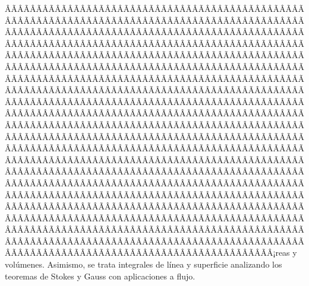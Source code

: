 \begin{sumilla}
\begin{fundamentacion}
ÂÃÂÃÂÃÂÃÂÃÂÃÂÃÂÃÂÃÂÃÂÃÂÃÂÃÂÃÂÃÂÃÂÃÂÃÂÃÂÃÂÃÂÃÂÃÂÃÂÃÂÃÂÃÂÃÂÃÂÃÂÃÂÃÂÃÂÃÂÃÂÃÂÃÂÃÂÃÂÃÂÃÂÃÂÃÂÃÂÃÂÃÂÃÂÃÂÃÂÃÂÃÂÃÂÃÂÃÂÃÂÃÂÃÂÃÂÃÂÃÂÃÂÃÂÃÂÃÂÃÂÃÂÃÂÃÂÃÂÃÂÃÂÃÂÃÂÃÂÃÂÃÂÃÂÃÂÃÂÃÂÃÂÃÂÃÂÃÂÃÂÃÂÃÂÃÂÃÂÃÂÃÂÃÂÃÂÃÂÃÂÃÂÃÂÃÂÃÂÃÂÃÂÃÂÃÂÃÂÃÂÃÂÃÂÃÂÃÂÃÂÃÂÃÂÃÂÃÂÃÂÃÂÃÂÃÂÃÂÃÂÃÂÃÂÃÂÃÂÃÂÃÂÃÂÃÂÃÂÃÂÃÂÃÂÃÂÃÂÃÂÃÂÃÂÃÂÃÂÃÂÃÂÃÂÃÂÃÂÃÂÃÂÃÂÃÂÃÂÃÂÃÂÃÂÃÂÃÂÃÂÃÂÃÂÃÂÃÂÃÂÃÂÃÂÃÂÃÂÃÂÃÂÃÂÃÂÃÂÃÂÃÂÃÂÃÂÃÂÃÂÃÂÃÂÃÂÃÂÃÂÃÂÃÂÃÂÃÂÃÂÃÂÃÂÃÂÃÂÃÂÃÂÃÂÃÂÃÂÃÂÃÂÃÂÃÂÃÂÃÂÃÂÃÂÃÂÃÂÃÂÃÂÃÂÃÂÃÂÃÂÃÂÃÂÃÂÃÂÃÂÃÂÃÂÃÂÃÂÃÂÃÂÃÂÃÂÃÂÃÂÃÂÃÂÃÂÃÂÃÂÃÂÃÂÃÂÃÂÃÂÃÂÃÂÃÂÃÂÃÂÃÂÃÂÃÂÃÂÃÂÃÂÃÂÃÂÃÂÃÂÃÂÃÂÃÂÃÂÃÂÃÂÃÂÃÂÃÂÃÂÃÂÃÂÃÂÃÂÃÂÃÂÃÂÃÂÃÂÃÂÃÂÃÂÃÂÃÂÃÂÃÂÃÂÃÂÃÂÃÂÃÂÃÂÃÂÃÂÃÂÃÂÃÂÃÂÃÂÃÂÃÂÃÂÃÂÃÂÃÂÃÂÃÂÃÂÃÂÃÂÃÂÃÂÃÂÃÂÃÂÃÂÃÂÃÂÃÂÃÂÃÂÃÂÃÂÃÂÃÂÃÂÃÂÃÂÃÂÃÂÃÂÃÂÃÂÃÂÃÂÃÂÃÂÃÂÃÂÃÂÃÂÃÂÃÂÃÂÃÂÃÂÃÂÃÂÃÂÃÂÃÂÃÂÃÂÃÂÃÂÃÂÃÂÃÂÃÂÃÂÃÂÃÂÃÂÃÂÃÂÃÂÃÂÃÂÃÂÃÂÃÂÃÂÃÂÃÂÃÂÃÂÃÂÃÂÃÂÃÂÃÂÃÂÃÂÃÂÃÂÃÂÃÂÃÂÃÂÃÂÃÂÃÂÃÂÃÂÃÂÃÂÃÂÃÂÃÂÃÂÃÂÃÂÃÂÃÂÃÂÃÂÃÂÃÂÃÂÃÂÃÂÃÂÃÂÃÂÃÂÃÂÃÂÃÂÃÂÃÂÃÂÃÂÃÂÃÂÃÂÃÂÃÂÃÂÃÂÃÂÃÂÃÂÃÂÃÂÃÂÃÂÃÂÃÂÃÂÃÂÃÂÃÂÃÂÃÂÃÂÃÂÃÂÃÂÃÂÃÂÃÂÃÂÃÂÃÂÃÂÃÂÃÂÃÂÃÂÃÂÃÂÃÂÃÂÃÂÃÂÃÂÃÂÃÂÃÂÃÂÃÂÃÂÃÂÃÂÃÂÃÂÃÂÃÂÃÂÃÂÃÂÃÂÃÂÃÂÃÂÃÂÃÂÃÂÃÂÃÂÃÂÃÂÃÂÃÂÃÂÃÂÃÂÃÂÃÂÃÂÃÂÃÂÃÂÃÂÃÂÃÂÃÂÃÂÃÂÃÂÃÂÃÂÃÂÃÂÃÂÃÂÃÂÃÂÃÂÃÂÃÂÃÂÃÂÃÂÃÂÃÂÃÂÃÂÃÂÃÂÃÂÃÂÃÂÃÂÃÂ¡reas y vol\'umenes.
Asimismo, se trata integrales de l\'inea y superficie analizando los teoremas de Stokes y Gauss con aplicaciones a flujo.
\end{fundamentacion}


\end{sumilla}
